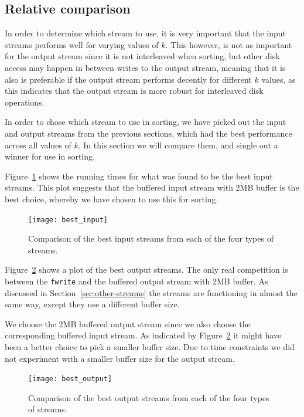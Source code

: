 \documentclass[a4paper,12pt]{article}
\begin{document}
\subsection{Relative comparison}
In order to determine which stream to use, it is very important that
the input streams performs well for varying values of $k$. This
however, is not as important for the output stream since it is not
interleaved when sorting, but other disk access may happen in between writes to the
output stream, meaning that it is also is preferable if
the output stream performs decently for different $k$ values, as this
indicates that the output stream is more robust for interleaved disk
operations.

In order to chose which stream to use in sorting, we have picked out
the input and output streams from the previous sections, which had the
best performance across all values of $k$. In this section we will
compare them, and single out a winner for use in sorting.

Figure~\ref{fig:best-input} shows the running times for what was found
to be the best input streams. This plot suggests that the buffered
input stream with 2MB buffer is the best choice, whereby we have
chosen to use this for sorting.

\begin{figure}[h!]
  \centering
  \texttt{[image: best\_input]}
  \caption{Comparison of the best input streams from each of the four
    types of streams.}
  \label{fig:best-input}
\end{figure}

Figure~\ref{fig:best-output} shows a plot of the best output
streams. The only real competition is between the \texttt{fwrite} and
the buffered output stream with 2MB buffer. As discussed in
Section~\ref{sec:other-streams} the streams are functioning in almost
the same way, except they use a different buffer size.

We choose the 2MB buffered output stream since we also choose the corresponding buffered input stream. As indicated by Figure~\ref{fig:best-output} it might have been a better choice to pick a smaller buffer size. Due to time constraints we did not experiment with a smaller buffer size for the output stream.

\begin{figure}[h!]
  \centering
  \texttt{[image: best\_output]}
  \caption{Comparison of the best output streams from each of the four
    types of streams.}
  \label{fig:best-output}
\end{figure}
\end{document}
